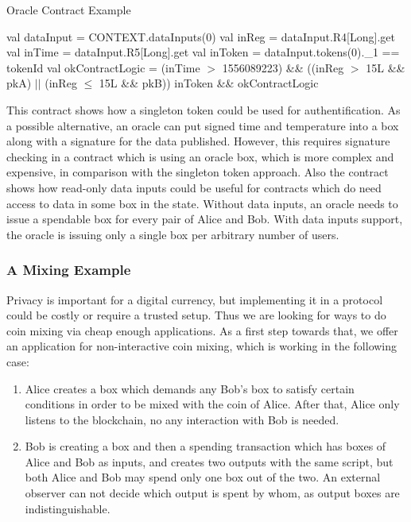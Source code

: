  \begin{algorithm}[H]
    \caption{Oracle Contract Example}
    \label{alg:oracle}
    \begin{algorithmic}[1]
        \State val dataInput = CONTEXT.dataInputs(0)
        \State val inReg = dataInput.R4[Long].get
        \State val inTime = dataInput.R5[Long].get
        \State val inToken = dataInput.tokens(0).\_1 == tokenId
        \State val okContractLogic = (inTime $>$ 1556089223) \&\&
        \State\hspace{\algorithmicindent}\hspace{\algorithmicindent} ((inReg $>$ 15L \&\& pkA) $||$ (inReg $\le$ 15L \&\& pkB))
        \State inToken \&\& okContractLogic
    \end{algorithmic}
 \end{algorithm}

 This contract shows how a singleton token could be used for authentification. As a possible alternative, an oracle
 can put signed time and temperature into a box along with a signature for the data published. However, this requires
 signature checking in a contract which is using an oracle box, which is more complex and expensive, in comparison with
 the singleton token approach. Also the contract shows how read-only data inputs could be useful for contracts which do
 need access to data in some box in the state. Without data inputs, an oracle needs to issue a spendable box for every
 pair of Alice and Bob. With data inputs support, the oracle is issuing only a single box per arbitrary number of users.

\subsubsection{A Mixing Example}
 \label{sec:platform}

 Privacy is important for a digital currency, but implementing it in a protocol could be costly or require a trusted
 setup. Thus we are looking for ways to do coin mixing via cheap enough applications. As a first step towards that, we
 offer an application for non-interactive coin mixing, which is working in the following case:
 \begin{enumerate}
    \item{} Alice creates a box which demands any Bob's box to satisfy certain conditions in order to be mixed with
    the coin of Alice. After that, Alice only listens to the blockchain, no any interaction with Bob is needed.
    \item{} Bob is creating a box and then a spending transaction which has boxes of Alice and Bob as inputs,
     and creates two outputs with the same script, but both Alice and Bob may spend only one box out of the two.
     An external observer can not decide which output is spent by whom, as output boxes are indistinguishable.
 \end{enumerate}

